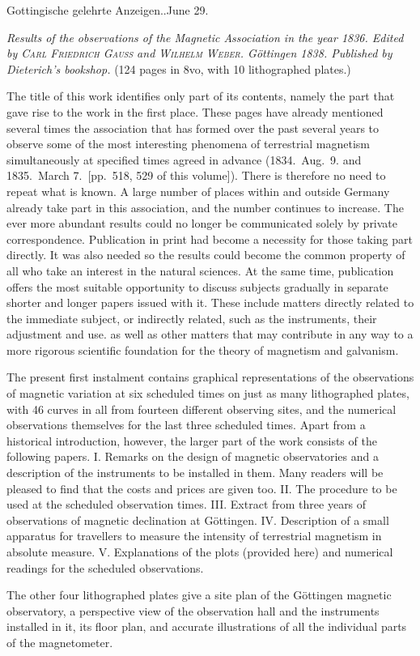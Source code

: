 \vspace{6mm}
\begin{center}\small Gottingische gelehrte Anzeigen..\quad June 29.\end{center}

\textit{Results of the observations of the Magnetic Association in the year \textup{1836.} Edited by \textup{\textsc{Carl Friedrich Gauss}} and \textup{\textsc{Wilhelm Weber}}. Göttingen \textup{1838.} Published by Dieterich’s bookshop.} (124 pages in 8vo, with 10 lithographed plates.)

The title of this work identifies only part of its contents, namely the part that gave rise to the work in the first place. These pages have already mentioned several times the association that has formed over the past several years to observe some of the most interesting phenomena of terrestrial magnetism simultaneously at specified times agreed in advance (1834.\ Aug.\ 9. and 1835.\ March 7.\ [pp.\ 518, 529 of this volume]). There is therefore no need to repeat what is known. A large number of places within and outside Germany already take part in this association, and the number continues to increase. The ever more abundant results could no longer be communicated solely by private correspondence. Publication in print had become a necessity for those taking part directly. It was also needed so the results could become the common property of all who take an interest in the natural sciences. At the same time, publication offers the most suitable opportunity to discuss subjects gradually in separate shorter and longer papers issued with it. These include matters directly related to the immediate subject, or indirectly related, such as the instruments, their adjustment and use. as well as other matters that may contribute in any way to a more rigorous scientific foundation for the theory of magnetism and galvanism.

The present first instalment contains graphical representations of the observations of magnetic variation at six scheduled times on just as many lithographed plates, with 46 curves in all from fourteen different observing sites, and the numerical observations themselves for the last three scheduled times. Apart from a historical introduction, however, the larger part of the work consists of the
following papers. I. Remarks on the design of magnetic observatories and a description of the instruments to be installed in them. Many readers will be pleased to find that the costs and prices are given too. II. The procedure to be used at the scheduled observation times. III. Extract from three years of observations of magnetic declination at Göttingen. IV. Description of a small apparatus for travellers to measure the intensity of terrestrial magnetism in absolute measure. V. Explanations of the plots (provided here) and numerical readings for the scheduled observations.

The other four lithographed plates give a site plan of the Göttingen magnetic observatory, a perspective view of the observation hall and the instruments installed in it, its floor plan, and accurate illustrations of all the individual parts of the magnetometer.

